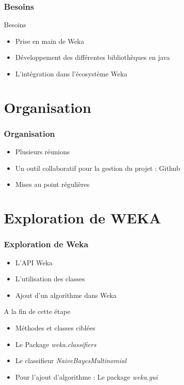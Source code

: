 \documentclass[12pt]{beamer}
\begin{document}
\begin{frame}
\frametitle{Besoins}
\begin{block}{Besoins}
\begin{itemize}
\item Prise en main de Weka
\item Développement des différentes bibliothèques en java
\item L'intégration dans l’écosystème Weka
\end{itemize}
\end{block}

\end{frame}

\section{Organisation}
\begin{frame}
\frametitle{Organisation}
\begin{itemize}
	\item Plusieurs réunions
	\item Un outil collaboratif pour la gestion du projet : Github
	\item Mises au point régulières
\end{itemize}
\end{frame}

\section{Exploration de WEKA}

\begin{frame}
\frametitle{Exploration de Weka}
\begin{itemize}
\item L'API Weka
\item L'utilisation des classes
\item Ajout d'un algorithme dans Weka
\end{itemize}
\begin{block}{A la fin de cette étape}
\begin{itemize}
\item Méthodes et classes ciblées
\item Le Package \textit{weka.classifiers}
\item Le classifieur \textit{NaiveBayesMultinomial}
\item Pour l'ajout d'algorithme : Le package \textit{weka.gui}
\end{itemize}
\end{block}
\end{frame}
\end{document}
